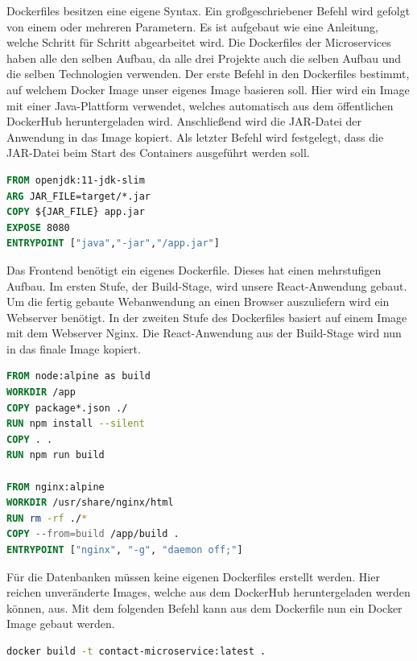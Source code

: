 Dockerfiles besitzen eine eigene Syntax. Ein großgeschriebener Befehl wird gefolgt von einem oder mehreren Parametern. Es ist aufgebaut wie eine Anleitung, welche Schritt für Schritt abgearbeitet wird. Die Dockerfiles der Microservices haben alle den selben Aufbau, da alle drei Projekte auch die selben Aufbau und die selben Technologien verwenden. Der erste Befehl in den Dockerfiles bestimmt, auf welchem Docker Image unser eigenes Image basieren soll. Hier wird ein Image mit einer Java-Plattform verwendet, welches automatisch aus dem öffentlichen DockerHub heruntergeladen wird. Anschließend wird die JAR-Datei der Anwendung in das Image kopiert. Als letzter Befehl wird festgelegt, dass die JAR-Datei beim Start des Containers ausgeführt werden soll.

\begin{lstlisting}[language=dockerfile, caption=Dockerfile für Kontakt-Microservice]
FROM openjdk:11-jdk-slim
ARG JAR_FILE=target/*.jar
COPY ${JAR_FILE} app.jar
EXPOSE 8080
ENTRYPOINT ["java","-jar","/app.jar"]
\end{lstlisting}

Das Frontend benötigt ein eigenes Dockerfile. Dieses hat einen mehrstufigen Aufbau. Im ersten Stufe, der Build-Stage, wird unsere React-Anwendung gebaut. Um die fertig gebaute Webanwendung an einen Browser auszuliefern wird ein Webserver benötigt. In der zweiten Stufe des Dockerfiles basiert auf einem Image mit dem Webserver Nginx. Die React-Anwendung aus der Build-Stage wird nun in das finale Image kopiert.

\begin{lstlisting}[language=dockerfile, caption=Dockerfile für Frontend]
FROM node:alpine as build
WORKDIR /app
COPY package*.json ./
RUN npm install --silent
COPY . .
RUN npm run build

FROM nginx:alpine
WORKDIR /usr/share/nginx/html
RUN rm -rf ./*
COPY --from=build /app/build .
ENTRYPOINT ["nginx", "-g", "daemon off;"]
\end{lstlisting}

Für die Datenbanken müssen keine eigenen Dockerfiles erstellt werden. Hier reichen unveränderte Images, welche aus dem DockerHub heruntergeladen werden können, aus. Mit dem folgenden Befehl kann aus dem Dockerfile nun ein Docker Image gebaut werden.

\begin{lstlisting}[language=bash, caption=Befehl , captionpos=b]
docker build -t contact-microservice:latest .
\end{lstlisting}


